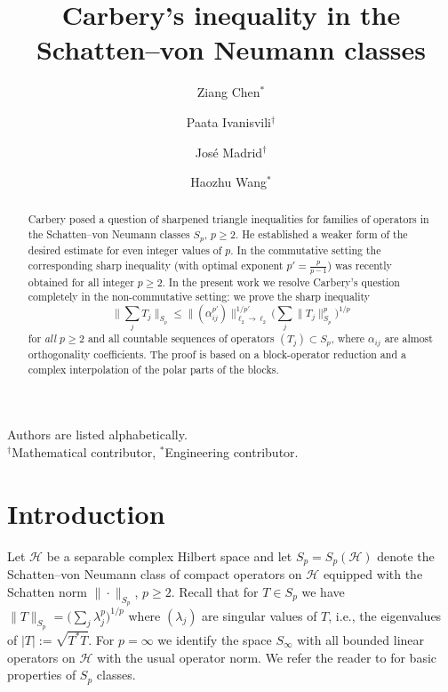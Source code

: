 \documentclass[11pt]{article}
\title{Carbery's inequality in the Schatten--von Neumann classes}
\author[3]{
  Ziang Chen$^\ast$
}
\author[1]{
  Paata Ivanisvili$^\dagger$
}
\author[2]{
  Jos\'e Madrid$^\dagger$
}
\author[3]{
  Haozhu Wang$^\ast$
}
\affil[1]{University of California, Irvine, \texttt{pivanisv@uci.edu}}
\affil[2]{Virginia Tech, \texttt{josemadrid@vt.edu}}
\affil[3]{xAI, \texttt{\{zchen,hwang\}@x.ai}}
\date{}
\theoremstyle{definition}
\newcommand{\1}{\mathbf{1}}
\begin{document}
\maketitle

\begin{center}
\small
Authors are listed alphabetically.\\
$^\dagger$Mathematical contributor,
$^\ast$Engineering contributor.
\end{center}

\begin{abstract}
Carbery posed a question of sharpened triangle inequalities for families of operators in the Schatten--von Neumann classes $S_p$, $p\geq 2$. He established a weaker form of the desired estimate for even integer values of $p$. In the commutative setting the corresponding sharp inequality (with optimal exponent $p'=\frac{p}{p-1}$) was recently obtained for all integer $p\geq 2$. In the present work we resolve Carbery's question completely in the non-commutative setting: we prove the sharp inequality
$$
\Big\|\sum_{j} T_{j}\Big\|_{S_{p}}\leq \|(\alpha_{ij}^{p'})\|^{1/p'}_{\ell_{2}\to \ell_{2}} \Big( \sum_{j} \|T_{j}\|^{p}_{S_{p}}\Big)^{1/p}
$$
for \emph{all} $p\geq 2$ and  all countable sequences of operators $(T_{j}) \subset S_{p}$, where $\alpha_{ij}$ are almost orthogonality coefficients. The proof is based on a block-operator reduction and a  complex interpolation of the
polar parts of the blocks. 
\end{abstract}

\section{Introduction}

Let $\mathcal{H}$ be a separable complex Hilbert space and let $S_p = S_p(\mathcal{H})$ denote the Schatten--von Neumann class of compact operators on $\mathcal{H}$ equipped with the Schatten norm $\|\cdot\|_{S_p}$, $p\geq 2$.
Recall that for $T \in S_{p}$ we have $\|T\|_{S_{p}} = \Big(\sum_{j} \lambda_{j}^{p}\Big)^{1/p
}$ where $(\lambda_{j})$ are singular values of $T$, i.e.,  the eigenvalues of $|T|:=\sqrt{T^{*}T}$. For $p=\infty$ we identify the space $S_{\infty}$ with all bounded linear operators on $\mathcal{H}$ with the usual operator norm. We refer the reader to \cite{Ringrose1971} for basic properties of $S_{p}$ classes.
\end{document}
